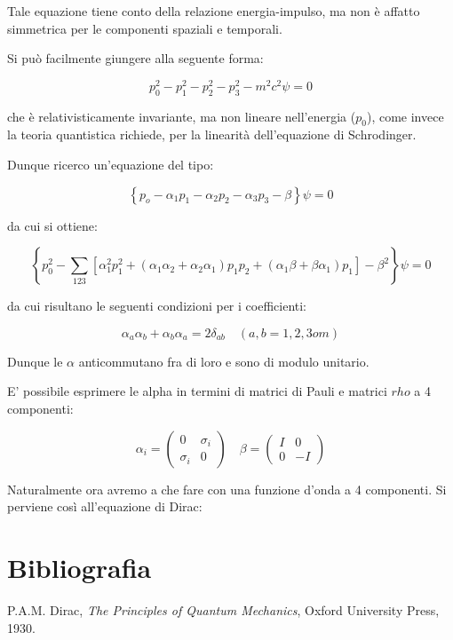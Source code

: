 \documentclass{article}
\begin{document}
Tale equazione tiene conto della relazione energia-impulso, ma non è affatto simmetrica per le componenti spaziali e temporali.

Si può facilmente giungere alla seguente forma:

\begin{equation}
  {p_0^2-p_1^2-p_2^2-p_3^2-m^2c^2}\psi=0
\end{equation}

che è relativisticamente invariante, ma non lineare nell'energia ($p_0$), come invece la teoria quantistica richiede, per la linearità dell'equazione di Schrodinger.

Dunque ricerco un'equazione del tipo:

\begin{equation}
  \left\{p_o-\alpha_1p_1-\alpha_2p_2-\alpha_3p_3-\beta\right\}\psi=0
\end{equation}

da cui si ottiene:

\begin{equation}
  \left\{p_0^2-\sum_{123}[\alpha_1^2p_1^2+(\alpha_1\alpha_2+\alpha_2\alpha_1)p_1p_2+(\alpha_1\beta+\beta\alpha_1)p_1]-\beta^2\right\}\psi=0
\end{equation}

da cui risultano le seguenti condizioni per i coefficienti:

\begin{equation}
  \alpha_a\alpha_b+\alpha_b\alpha_a=2\delta_{ab} \quad (a,b=1,2,3 o m)
\end{equation}

Dunque le $\alpha$ anticommutano fra di loro e sono di modulo unitario.

E' possibile esprimere le alpha in termini di matrici di Pauli e matrici $rho$ a 4 componenti:

\begin{equation}
  \alpha_i=\begin{pmatrix}
    0        & \sigma_i \\
    \sigma_i & 0
  \end{pmatrix}
  \quad
  \beta=\begin{pmatrix}
    I & 0  \\
    0 & -I
  \end{pmatrix}
\end{equation}

Naturalmente ora avremo a che fare con una funzione d'onda a 4 componenti.
Si perviene così all'equazione di Dirac:



\section{Bibliografia}
\begin{thebibliography}{9}
   P.A.M. Dirac, \emph{The Principles of Quantum Mechanics}, Oxford University Press, 1930.
\end{thebibliography}
\end{document}
